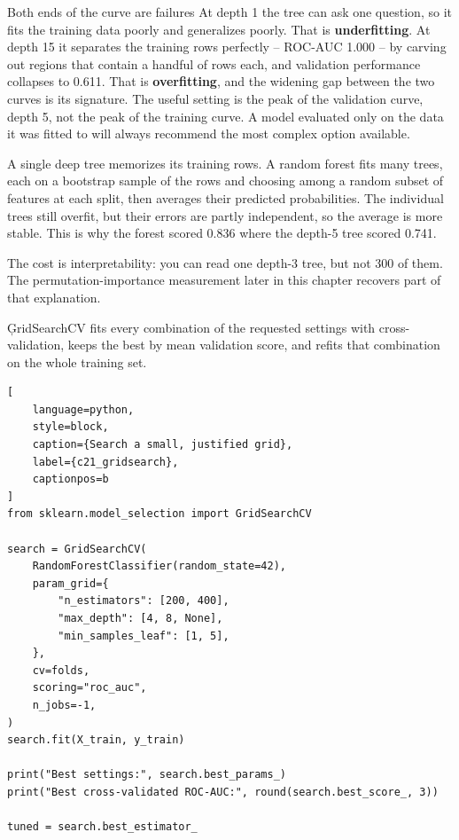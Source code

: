 \begin{ExplainBox}{Both ends of the curve are failures}
At depth 1 the tree can ask one question, so it fits the training data poorly
and generalizes poorly. That is \textbf{underfitting}. At depth 15 it separates
the training rows perfectly -- ROC-AUC 1.000 -- by carving out regions that
contain a handful of rows each, and validation performance collapses to 0.611.
That is \textbf{overfitting}, and the widening gap between the two curves is its
signature. The useful setting is the peak of the validation curve, depth 5, not
the peak of the training curve. A model evaluated only on the data it was fitted
to will always recommend the most complex option available.
\end{ExplainBox}


A single deep tree memorizes its training rows. A random forest fits many trees,
each on a bootstrap sample of the rows and choosing among a random subset of
features at each split, then averages their predicted probabilities. The
individual trees still overfit, but their errors are partly independent, so the
average is more stable. This is why the forest scored 0.836 where the
depth-5 tree scored 0.741.

The cost is interpretability: you can read one depth-3 tree, but not 300 of them.
The permutation-importance measurement later in this chapter recovers part of
that explanation.


\c{GridSearchCV} fits every combination of the requested settings with
cross-validation, keeps the best by mean validation score, and refits that
combination on the whole training set.

\begin{lstlisting}[
    language=python,
    style=block,
    caption={Search a small, justified grid},
    label={c21_gridsearch},
    captionpos=b
]
from sklearn.model_selection import GridSearchCV

search = GridSearchCV(
    RandomForestClassifier(random_state=42),
    param_grid={
        "n_estimators": [200, 400],
        "max_depth": [4, 8, None],
        "min_samples_leaf": [1, 5],
    },
    cv=folds,
    scoring="roc_auc",
    n_jobs=-1,
)
search.fit(X_train, y_train)

print("Best settings:", search.best_params_)
print("Best cross-validated ROC-AUC:", round(search.best_score_, 3))

tuned = search.best_estimator_
\end{lstlisting}

